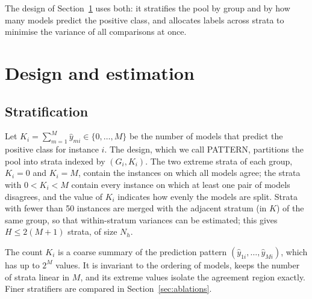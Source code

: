 \documentclass[pdflatex,sn-mathphys-num,iicol]{sn-jnl}
\theoremstyle{thmstyleone}
\theoremstyle{thmstyletwo}
\theoremstyle{thmstylethree}
\begin{document}
The design of Section~\ref{sec:design} uses both: it stratifies the pool by group and by how many models predict the positive class, and allocates labels across strata to minimise the variance of all comparisons at once.

\section{Design and estimation}\label{sec:design}

\subsection{Stratification}
Let $K_i=\sum_{m=1}^M\hat y_{mi}\in\{0,\dots,M\}$ be the number of models that predict the positive class for instance $i$. The design, which we call PATTERN, partitions the pool into strata indexed by $(G_i,K_i)$. The two extreme strata of each group, $K_i=0$ and $K_i=M$, contain the instances on which all models agree; the strata with $0<K_i<M$ contain every instance on which at least one pair of models disagrees, and the value of $K_i$ indicates how evenly the models are split. Strata with fewer than 50 instances are merged with the adjacent stratum (in $K$) of the same group, so that within-stratum variances can be estimated; this gives $H\le 2(M+1)$ strata, of size $N_h$.

The count $K_i$ is a coarse summary of the prediction pattern $(\hat y_{1i},\dots,\hat y_{Mi})$, which has up to $2^M$ values. It is invariant to the ordering of models, keeps the number of strata linear in $M$, and its extreme values isolate the agreement region exactly. Finer stratifiers are compared in Section~\ref{sec:ablations}.
\end{document}
